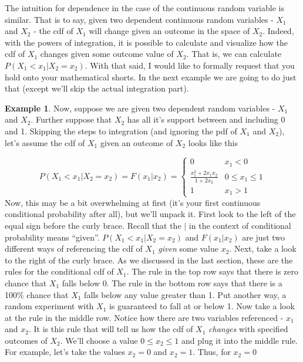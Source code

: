\documentclass[
]{book}
\theoremstyle{definition}
\theoremstyle{definition}
\newtheorem{example}{Example}[chapter]
\theoremstyle{definition}
\theoremstyle{definition}
\theoremstyle{remark}
\begin{document}
The intuition for dependence in the case of the continuous random variable is similar. That is to say, given two dependent continuous random variables - \(X_1\) and \(X_2\) - the cdf of \(X_1\) will change given an outcome in the space of \(X_2\). Indeed, with the powers of integration, it is possible to calculate and visualize how the cdf of \(X_1\) changes given some outcome value of \(X_2\). That is, we can calculate \(P(X_1 < x_1 | X_2 = x_2)\). With that said, I would like to formally request that you hold onto your mathematical shorts. In the next example we are going to do just that (except we'll skip the actual integration part).

\begin{example}
Now, suppose we are given two dependent random variables - \(X_1\) and \(X_2\). Further suppose that \(X_2\) has all it's support between and including 0 and 1. Skipping the steps to integration (and ignoring the pdf of \(X_1\) and \(X_2\)), let's assume the cdf of \(X_1\) given an outcome of \(X_2\) looks like this

\[
P(X_1 < x_1 | X_2 = x_2) = F(x_1|x_2) = 
\begin{cases}
0 & x_1 < 0\\
\frac{x_1^2 + 2x_1x_2}{1 + 2x_2} & 0 \leq x_1 \leq 1\\
1 & x_1 > 1
\end{cases} 
\]
Now, this may be a bit overwhelming at first (it's your first continuous conditional probability after all), but we'll unpack it. First look to the left of the equal sign before the curly brace. Recall that the \(|\) in the context of conditional probability means ``given''. \(P(X_1 < x_1 | X_2 = x_2)\) and \(F(x_1|x_2)\) are just two different ways of referencing the cdf of \(X_1\) \emph{given} some value \(x_2\). Next, take a look to the right of the curly brace. As we discussed in the last section, these are the rules for the conditional cdf of \(X_1\). The rule in the top row says that there is zero chance that \(X_1\) falls below 0. The rule in the bottom row says that there is a 100\% chance that \(X_1\) falls below any value greater than 1. Put another way, a random experiment with \(X_1\) is guaranteed to fall at or below 1. Now take a look at the rule in the middle row. Notice how there are two variables referenced - \(x_1\) and \(x_2\). It is this rule that will tell us how the cdf of \(X_1\) \emph{changes} with specified outcomes of \(X_2\). We'll choose a value \(0 \leq x_2 \leq 1\) and plug it into the middle rule. For example, let's take the values \(x_2 = 0\) and \(x_2 = 1\). Thus, for \(x_2 = 0\)


\end{example}
\end{document}
